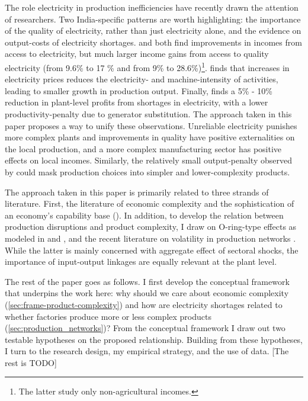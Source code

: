 The role electricity in production inefficiencies have recently drawn the attention of researchers. Two India-specific patterns are worth highlighting: the importance of the quality of electricity, rather than just electricity alone, and the evidence on output-costs of electricity shortages. \cite{samad_benefits_2016} and \cite{chakravorty_does_2014} both find improvements in incomes from access to electricity, but much larger income gains from access to quality electricity (from 9.6\% to 17 \% and from 9\% to 28.6\%)\footnote{The latter study only non-agricultural incomes.}. \cite{abeberese_electricity_2017} finds that increases in electricity prices reduces the electricity- and machine-intensity of activities, leading to smaller growth in production output. Finally, \cite{allcott_how_2016} finds a 5\% - 10\% reduction in plant-level profits from shortages in electricity, with a lower productivity-penalty due to generator substitution. The approach taken in this paper proposes a way to unify these observations. Unreliable electricity punishes more complex plants and improvements in quality have positive externalities on the local production, and a more complex manufacturing sector has positive effects on local incomes. Similarly, the relatively small output-penalty observed by \cite{allcott_how_2016} could mask production choices into simpler and lower-complexity products.

The approach taken in this paper is primarily related to three strands of literature. First, the literature of economic complexity and the sophistication of an economy's capability base  (\citealp{frenken_related_2007,hausmann_atlas_2013,tacchella_new_2012}). In addition, to develop the relation between production disruptions and product complexity, I draw on O-ring-type effects as modeled in \cite{kremer_o-ring_1993} and \cite{jones_intermediate_2011}, and the recent literature on volatility in production networks \citep{acemoglu_network_2012}. While the latter is mainly concerned with aggregate effect of sectoral shocks, the importance of input-output linkages are equally relevant at the plant level.

The rest of the paper goes as follows. I first develop the conceptual framework that underpins the work here: why should we care about economic complexity (\ref{sec:frame-product-complexity}) and how are electricity shortages related to whether factories produce more or less complex products (\ref{sec:production_networks})? From the conceptual framework I draw out two testable hypotheses on the proposed relationship. Building from these hypotheses, I turn to the research design, my empirical strategy, and the use of data. [The rest is TODO]
